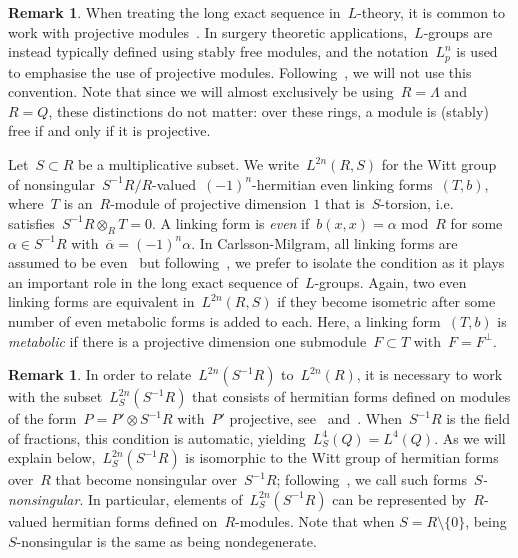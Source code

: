 \documentclass[10.9pt,a4paper]{amsart}
\theoremstyle{definition}
\newtheorem{remark}[theorem]{Remark}
\theoremstyle{remark}
\begin{document}
\begin{remark}
When treating the long exact sequence in~$L$-theory, it is common to work with projective modules~\cite{CarlssonMilgram,Ranicki}.
In surgery theoretic applications,~$L$-groups are instead typically defined using stably free modules, and the notation~$L^n_p$ is used to emphasise the use of projective modules.
Following~\cite{Ranicki}, we will not use this convention. Note that since we will almost exclusively be using~$R=\Lambda$ and~$R=Q$, these distinctions do not matter: over these rings, a module is (stably) free if and only if it is projective. 
\end{remark}

Let~$S \subset R$ be a multiplicative subset.
We write~$L^{2n}(R,S)$ for the Witt group of nonsingular~$S^{-1}R/R$-valued~$(-1)^n$-hermitian even linking forms~$(T,b)$, where~$T$ is an~$R$-module of projective dimension~$1$ that is~$S$-torsion, i.e. satisfies~$S^{-1}R \otimes_R T=0$.
A linking form is \emph{even} if~$b(x,x)=\alpha$ mod~$R$ for some~$\alpha \in S^{-1}R$ with~$\overline{\alpha}=(-1)^n\alpha$.
In Carlsson-Milgram, all linking forms are assumed to be even~\cite[Definition 4 (c)]{CarlssonMilgram} but following~\cite[page~223]{Ranicki}, we prefer to isolate the condition as it plays an important role in the long exact sequence of~$L$-groups.
Again,  two even linking forms are equivalent in~$L^{2n}(R,S)$ if they become isometric after some number of even metabolic forms is added to each.
Here, a linking form~$(T,b)$ is \emph{metabolic} if there is a projective dimension one submodule~$F \subset T$ with~$F=F^\perp$.


\begin{remark}
In order to relate~$L^{2n}(S^{-1}R)$ to~$L^{2n}(R)$,  it is necessary to work with the subset~$L^{2n}_S(S^{-1}R)$ that consists of hermitian forms defined on modules of the form~$P=P' \otimes S^{-1}R$ with~$P'$ projective, see~\cite[page 172]{Ranicki} and~\cite{CarlssonMilgram}.
When~$S^{-1}R$ is the field of fractions,  this condition is automatic, yielding~$L_S^4(Q)=L^4(Q)$.
As we will explain below,~$L^{2n}_S(S^{-1}R)$ is isomorphic to the Witt group of hermitian forms over~$R$ that become nonsingular over~$S^{-1}R$; following~\cite[page 150]{Ranicki}, we call such forms~\emph{$S$-nonsingular}.
In particular, elements of~$L^{2n}_S(S^{-1}R)$ can be represented by~$R$-valued hermitian forms defined on~$R$-modules.
Note that when $S=R \setminus \{0\}$, being $S$-nonsingular is the same as being nondegenerate.
\end{remark}
\end{document}
